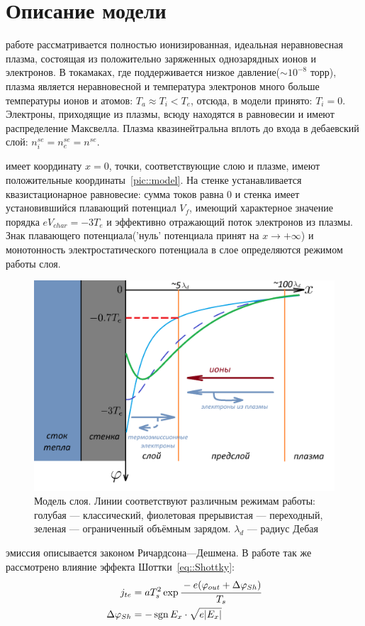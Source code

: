 \section{Описание модели}

 работе рассматривается полностью ионизированная, идеальная неравновесная 
плазма, состоящая из положительно заряженных однозарядных ионов и электронов. 
В токамаках, где поддерживается низкое давление($\sim 10^{-8}$ торр), плазма является неравновесной и температура
электронов много больше температуры ионов и атомов: $T_a \approx T_i < T_e$, отсюда, в модели принято: $T_i = 0$. Электроны, приходящие из плазмы,
всюду находятся в равновесии и имеют распределение Максвелла. Плазма квазинейтральна вплоть
до входа в дебаевский слой: $n_i^{se} = n_e^{se} = n^{se}$.


 имеет координату $x = 0$, точки, соответствующие слою и
плазме, имеют положительные координаты~\autoref{pic::model}.
На стенке устанавливается квазистационарное равновесие: сумма токов равна 0 и стенка имеет установившийся плавающий потенциал $V_f$, имеющий
характерное значение порядка $eV_{char} = -3T_e$ и эффективно отражающий поток электронов из плазмы. Знак плавающего
потенциала('нуль' потенциала принят на $x\rightarrow + \infty$) 
и монотонность электростатического потенциала в
слое определяются режимом работы слоя.

\begin{figure}
	\centering
	\includegraphics[width=0.7\linewidth]{material/model.png}
	\caption{Модель слоя. Линии соответствуют различным режимам работы: голубая --- классический, фиолетовая прерывистая --- переходный, зеленая --- ограниченный объёмным зарядом. $\lambda_d$ --- радиус Дебая}
	\label{pic::model}
\end{figure}

 эмиссия описывается законом Ричардсона---Дешмена. В работе так же рассмотрено влияние эффекта Шоттки~\eqref{eq::Shottky}:
\begin{subequations}
    \begin{align}
        j_{te} &= aT_s^2\exp{\cfrac{-e(\varphi_{out} + \Delta\varphi_{Sh})}{T_s}}
        \\ \Delta\varphi_{Sh} &= -\operatorname{\mathop{sgn}}{E_x}\cdot\sqrt{e\lvert E_x\rvert}
    \end{align}
    \label{eq::Shottky}
\end{subequations}


